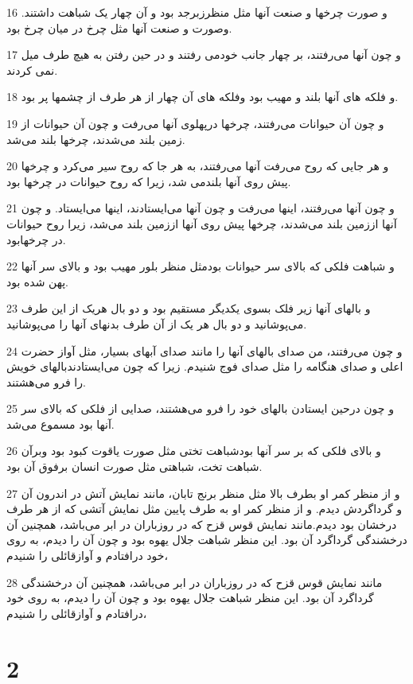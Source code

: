 \par 16 و صورت چرخها و صنعت آنها مثل منظرزبرجد بود و آن چهار یک شباهت داشتند. وصورت و صنعت آنها مثل چرخ در میان چرخ بود.
\par 17 و چون آنها می‌رفتند، بر چهار جانب خودمی رفتند و در حین رفتن به هیچ طرف میل نمی کردند.
\par 18 و فلکه های آنها بلند و مهیب بود وفلکه های آن چهار از هر طرف از چشمها پر بود.
\par 19 و چون آن حیوانات می‌رفتند، چرخها درپهلوی آنها می‌رفت و چون آن حیوانات از زمین بلند می‌شدند، چرخها بلند می‌شد.
\par 20 و هر جایی که روح می‌رفت آنها می‌رفتند، به هر جا که روح سیر می‌کرد و چرخها پیش روی آنها بلندمی شد، زیرا که روح حیوانات در چرخها بود.
\par 21 و چون آنها می‌رفتند، اینها می‌رفت و چون آنها می‌ایستادند، اینها می‌ایستاد. و چون آنها اززمین بلند می‌شدند، چرخها پیش روی آنها اززمین بلند می‌شد، زیرا روح حیوانات در چرخهابود.
\par 22 و شباهت فلکی که بالای سر حیوانات بودمثل منظر بلور مهیب بود و بالای سر آنها پهن شده بود.
\par 23 و بالهای آنها زیر فلک بسوی یکدیگر مستقیم بود و دو بال هریک از این طرف می‌پوشانید و دو بال هر یک از آن طرف بدنهای آنها را می‌پوشانید.
\par 24 و چون می‌رفتند، من صدای بالهای آنها را مانند صدای آبهای بسیار، مثل آواز حضرت اعلی و صدای هنگامه را مثل صدای فوج شنیدم. زیرا که چون می‌ایستادندبالهای خویش را فرو می‌هشتند.
\par 25 و چون درحین ایستادن بالهای خود را فرو می‌هشتند، صدایی از فلکی که بالای سر آنها بود مسموع می‌شد.
\par 26 و بالای فلکی که بر سر آنها بودشباهت تختی مثل صورت یاقوت کبود بود وبرآن شباهت تخت، شباهتی مثل صورت انسان برفوق آن بود.
\par 27 و از منظر کمر او بطرف بالا مثل منظر برنج تابان، مانند نمایش آتش در اندرون آن و گرداگردش دیدم. و از منظر کمر او به طرف پایین مثل نمایش آتشی که از هر طرف درخشان بود دیدم.مانند نمایش قوس قزح که در روزباران در ابر می‌باشد، همچنین آن درخشندگی گرداگرد آن بود. این منظر شباهت جلال یهوه بود و چون آن را دیدم، به روی خود در‌افتادم و آوازقائلی را شنیدم،
\par 28 مانند نمایش قوس قزح که در روزباران در ابر می‌باشد، همچنین آن درخشندگی گرداگرد آن بود. این منظر شباهت جلال یهوه بود و چون آن را دیدم، به روی خود در‌افتادم و آوازقائلی را شنیدم،

\chapter{2}

